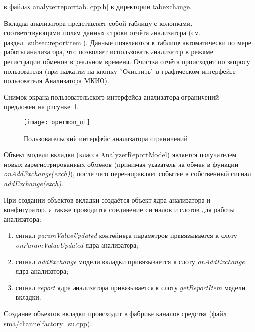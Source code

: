 в файлах analyzerreporttab.[cpp|h] в директории tabexchange.

Вкладка анализатора представляет собой таблицу с колонками, соответствующими 
полям данных строки отчёта анализатора (см. раздел~\ref{subsec:reportitem}). 
Данные появляются в таблице автоматически по мере работы анализатора, что 
позволяет использовать анализатор в режиме регистрации обменов в реальном 
времени. Очистка отчёта происходит по запросу пользователя (при нажатии на 
кнопку ``Очистить'' в графическом интерфейсе пользователя Анализатора МКИО).

Снимок экрана пользовательского интерфейса анализатора ограничений предложен на 
рисунке~\ref{fig:opermon_ui}.

\begin{figure}[ht]
 \centering
 \texttt{[image: opermon\_ui]}
 \caption{Пользовательский интерфейс анализатора ограничений}
 \label{fig:opermon_ui}
\end{figure}

Объект модели вкладки (класса AnalyzerReportModel) является получателем новых 
зарегистрированных обменов (принимая указатель на обмен в функции 
\textit{onAddExchange(exch)}), после чего перенаправляет событие в собственный 
сигнал \textit{addExchange(exch)}.

При создании объектов вкладки создаётся объект ядра анализатора и конфигуратор, 
а также проводится соединение сигналов и слотов для работы анализатора:

\begin{enumerate}
 \item сигнал \textit{paramValueUpdated} контейнера параметров привязывается к 
слоту \textit{onParamValueUpdated} ядра анализатора;
 \item сигнал \textit{addExchange} модели вкладки привязывается к слоту 
\textit{onAddExchange} ядра анализатора;
 \item сигнал \textit{report} ядра анализатора привязывается к слоту 
\textit{getReportItem} модели вкладки.
\end{enumerate}

Создание объектов вкладки происходит в фабрике каналов средства (файл 
sma/channelfactory\_su.cpp).